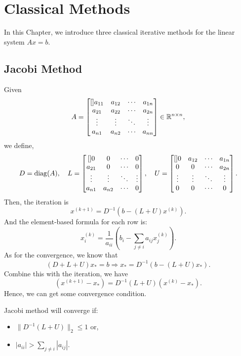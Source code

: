 \chapter{Classical Methods}
In this Chapter, we introduce three classical iterative methods for the linear system $ Ax=b $.  

\section{Jacobi Method} 
Given 
\[
    A = \begin{bmatrix}[] 
        a_{11} & a_{12} & \cdots &  a_{1n} \\
        a_{21} & a_{22} & \cdots &  a_{2n} \\
        \vdots & \vdots & \ddots &  \vdots \\
        a_{n1} & a_{n2} & \cdots &  a_{nn} \\
    \end{bmatrix}\in \mathbb{R}^{n\times n}, 
\]
we define, 
\[
    D = {\rm diag}(A),\quad L = \begin{bmatrix}[] 
        0 & 0 & \cdots &  0 \\
        a_{21} & 0 & \cdots & 0   \\
        \vdots & \vdots  &\ddots  &\vdots    \\
         a_{n1} &a_{n2}  &\cdots  & 0   \\
    \end{bmatrix} , \quad U = \begin{bmatrix}[] 
        0 & a_{12} & \cdots &  a_{1n} \\
        0 & 0 & \cdots &  a_{2n} \\
        \vdots & \vdots & \ddots &  \vdots \\
        0 & 0 & \cdots &  0 \\
    \end{bmatrix}. 
\]
Then, the iteration is 
\[
    x^{(k+1)} = D^{-1} (b-(L+U)x^{(k)}).    
\]
And the element-based formula for each row is: 
\[
    x_{i}^{(k)} = \frac{1}{a_{ii}} (b_i - \sum_{j\neq i}a_{ij} x_j^{(k)}). 
\]
As for the convergence, we know that 
\[
    (D+L+U) x_* = b \Rightarrow x_* = D^{-1} (b- (L+U) x_*). 
\]
Combine this with the iteration, we have 
\[
    (x^{(k+1)}-x_*) = D^{-1} (L+U)(x^{(k)}-x_*). 
\]
Hence, we can get some convergence condition. 


\begin{corollary}
\label{cor: Convergence of Jacobi Method}
Jacobi method will converge if: 
\begin{itemize}
    \item $ \|D^{-1} (L+U)\|_2 \le 1 $ or, 
    \item $ |a_{ii}| > \sum_{j\neq i}|a_{ij}| $. 
\end{itemize}
\end{corollary}

